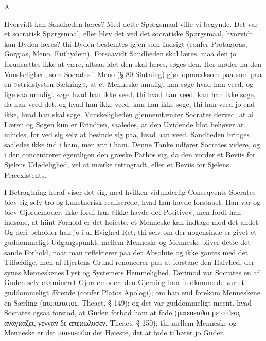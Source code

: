 \documentclass[12pt,a4paper]{article}
\begin{document}
A

Hvorvidt kan Sandheden læres? Med dette Spørgsmaal ville vi begynde. Det var et socratisk Spørgsmaal, eller blev det ved det socratiske Spørgsmaal, hvorvidt kan Dyden læres? thi Dyden bestemtes igjen som Indsigt (confer Protagoras, Gorgias, Meno, Euthydem). Forsaavidt Sandheden skal læres, maa den jo forudsættes ikke at være, altsaa idet den skal læres, søges den. Her møder nu den Vanskelighed, som Socrates i Meno (§ 80 Slutning) gjør opmærksom paa som paa en »stridslysten Sætning«, at et Menneske umuligt kan søge hvad han veed, og lige saa umuligt søge hvad han ikke veed; thi hvad han veed, kan han ikke søge, da han veed det, og hvad han ikke veed, kan han ikke søge, thi han veed jo end ikke, hvad han skal søge. Vanskeligheden gjennemtænker Socrates derved, at al Læren og Søgen kun er Erindren, saaledes, at den Uvidende blot behøver at mindes, for ved sig selv at besinde sig paa, hvad han veed. Sandheden bringes saaledes ikke ind i ham, men var i ham. Denne Tanke udfører Socrates videre, og i den concentrerer egentligen den græske Pathos sig, da den vorder et Beviis for Sjelens Udødelighed, vel at mærke retrogradt, eller et Beviis for Sjelens Præexistents.

I Betragtning heraf viser det sig, med hvilken vidunderlig Conseqvents Socrates blev sig selv tro og kunstnerisk realiserede, hvad han havde forstaaet. Han var og blev Gjordemoder; ikke fordi han »ikke havde det Positive«, men fordi han indsaae, at hiint Forhold er det høieste, et Menneske kan indtage mod det andet. Og deri beholder han jo i al Evighed Ret; thi selv om der nogensinde er givet et guddommeligt Udgangspunkt, mellem Menneske og Menneske bliver dette det sande Forhold, naar man reflekterer paa det Absolute og ikke gantes med det Tilfældige, men af Hjertens Grund renoncerer paa at forstaae den Halvhed, der synes Menneskenes Lyst og Systemets Hemmelighed. Derimod var Socrates en af Guden selv examineret Gjordemoder; den Gjerning han fuldkommede var et guddommeligt Ærende (confer Platos Apologi); om han end forekom Menneskene en Særling (ατοπωτατος. Theaet. § 149); og det var guddommeligt meent, hvad Socrates ogsaa forstod, at Guden forbød ham at føde (μαιευεσϑαι με ο ϑεος αναγϰαζει, γενναν δε απεϰωλυσεν. Theaet. § 150); thi mellem Menneske og Menneske er det μαιευεσϑαι det Høieste, det at føde tilhører jo Guden.
\end{document}
